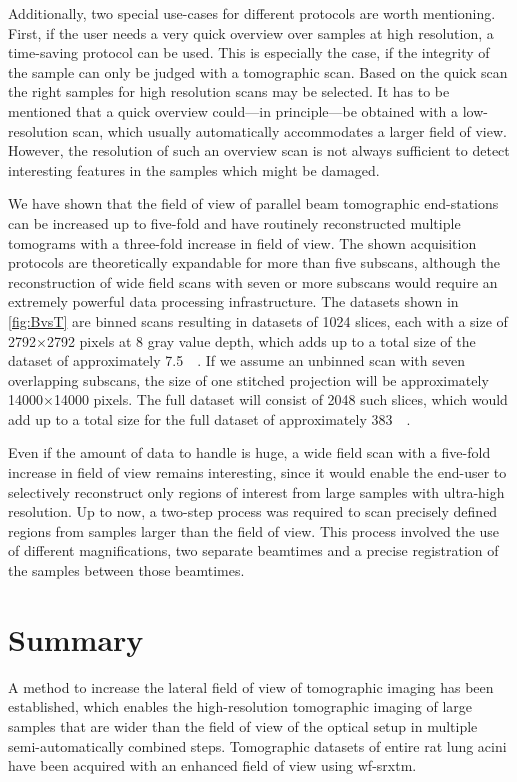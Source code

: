 Additionally, two special use-cases for different protocols are worth mentioning. First, if the user needs a very quick overview over samples at high resolution, a time-saving protocol can be used. This is especially the case, if the integrity of the sample can only be judged with a tomographic scan. Based on the quick scan the right samples for high resolution scans may be selected. It has to be mentioned that a quick overview could---in principle---be obtained with a low-resolution scan, which usually automatically accommodates a larger field of view. However, the resolution of such an overview scan is not always sufficient to detect interesting features in the samples which might be damaged.

We have shown that the field of view of parallel beam tomographic end-stations can be increased up to five-fold and have routinely reconstructed multiple tomograms with a three-fold increase in field of view. The shown acquisition protocols are theoretically expandable for more than five subscans, although the reconstruction of wide field scans with seven or more subscans would require an extremely powerful data processing infrastructure. The datasets shown in \autoref{fig:BvsT} are binned scans resulting in datasets of 1024 slices, each with a size of 2792$\times$2792 pixels at \SI{8}{\bit} gray value depth, which adds up to a total size of the dataset of approximately \SI{7.5}{\giga\byte}. If we assume an unbinned scan with seven overlapping subscans, the size of one stitched projection will be approximately 14000$\times$14000 pixels. The full dataset will consist of 2048 such slices, which would add up to a total size for the full dataset of approximately \SI{383}{\giga\byte}.

Even if the amount of data to handle is huge, a wide field scan with a five-fold increase in field of view remains interesting, since it would enable the end-user to selectively reconstruct only regions of interest from large samples with ultra-high resolution. Up to now, a two-step process was required to scan precisely defined regions from samples larger than the field of view. This process involved the use of different magnifications, two separate beamtimes and a precise registration of the samples between those beamtimes.

\section{Summary}\label{summary}
A method to increase the lateral field of view of tomographic imaging has been established, which enables the high-resolution tomographic imaging of large samples that are wider than the field of view of the optical setup in multiple semi-automatically combined steps. Tomographic datasets of entire rat lung acini have been acquired with an enhanced field of view using \ac{wf-srxtm}.

